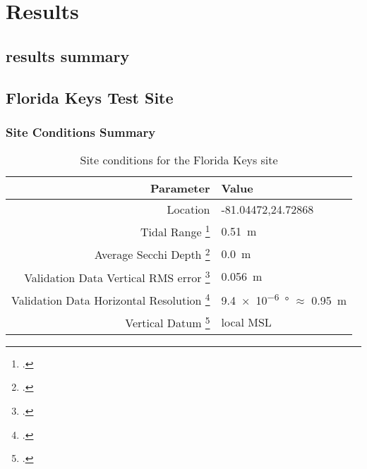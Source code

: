\chapter{Results}


\section{results summary}


\section{Florida Keys Test Site}
\subsection{Site Conditions Summary}


\begin{table}[htbp]
    \begin{minipage}{0.5\textwidth}
        \centering\begin{tabular}{r l }
            Parameter                                                      & \textbf{Value}                                 \\
            \hline
            Location                                                       & -81.04472,24.72868                             \\
            Tidal Range \footcite{tidal_data_reanalysis2022}               & \qty{0.51}{m}                                  \\
            Average Secchi Depth \footcite{ACRI-STGlobColourTeam2020}      & \qty{0.0}{m}                                   \\
            Validation Data Vertical RMS error \footcite{Keys2019Lidar}    & \qty{0.056}{m}                                 \\
            Validation Data Horizontal Resolution \footcite{Keys2019Lidar} & \qty{9.4e-6}{ \degree} $\approx$ \qty{0.95}{m} \\
            Vertical Datum \footcite{Keys2019Lidar}                        & local MSL                                      \\
        \end{tabular}
    \end{minipage}
    \caption{Site conditions for the Florida Keys site}
    \label{table:floridasitestats}
\end{table}



